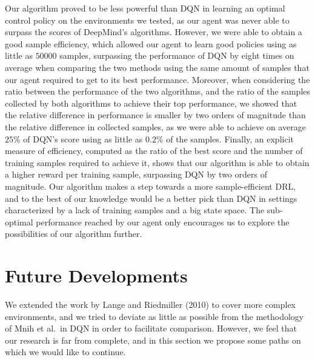 Our algorithm proved to be less powerful than DQN in learning an optimal control
policy on the environments we tested, as our agent was never able to surpass the
scores of DeepMind's algorithms.
However, we were able to obtain a good sample efficiency, which allowed our 
agent to learn good policies using as little as $50000$ samples, surpassing the 
performance of DQN by eight times on average when comparing the two methods 
using the same amount of samples that our agent required to get to its best 
performance.
Moreover, when considering the ratio between the performance of the two 
algorithms, and the ratio of the samples collected by both algorithms to 
achieve their top performance, we showed that the relative difference in 
performance is smaller by two orders of magnitude than the relative difference 
in collected samples, as we were able to achieve on average $25\%$ of DQN's 
score using as little as $0.2\%$ of the samples. 
Finally, an explicit measure of efficiency, computed as the ratio of the best
score and the number of training samples required to achieve it, shows that our 
algorithm is able to obtain a higher reward per training sample, surpassing DQN
by two orders of magnitude. 
Our algorithm makes a step towards a more sample-efficient DRL, and to the
best of our knowledge would be a better pick than DQN in settings characterized 
by a lack of training samples and a big state space. The sub-optimal performance
reached by our agent only encourages us to explore the possibilities of our
algorithm further.

\section{Future Developments}
We extended the work by Lange and Riedmiller (2010) \cite{lange2010deep} to 
cover more complex environments, and we tried to deviate as little as possible 
from the methodology of Mnih et al.\ in DQN in order to facilitate comparison. 
However, we feel that our research is far from complete, and in this section we 
propose some paths on which we would like to continue. 

